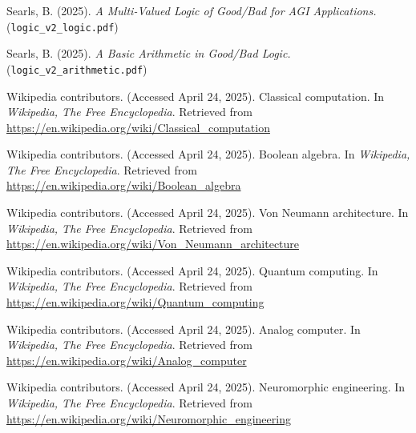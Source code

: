 \documentclass{article}
\begin{document}
\begin{thebibliography}{9} %

 Searls, B. (2025). \textit{A Multi-Valued Logic of Good/Bad for AGI Applications.} (\texttt{logic\_v2\_logic.pdf})

 Searls, B. (2025). \textit{A Basic Arithmetic in Good/Bad Logic.} (\texttt{logic\_v2\_arithmetic.pdf})

 Wikipedia contributors. (Accessed April 24, 2025). Classical computation. In \textit{Wikipedia, The Free Encyclopedia}. Retrieved from \url{https://en.wikipedia.org/wiki/Classical_computation}

 Wikipedia contributors. (Accessed April 24, 2025). Boolean algebra. In \textit{Wikipedia, The Free Encyclopedia}. Retrieved from \url{https://en.wikipedia.org/wiki/Boolean_algebra}

 Wikipedia contributors. (Accessed April 24, 2025). Von Neumann architecture. In \textit{Wikipedia, The Free Encyclopedia}. Retrieved from \url{https://en.wikipedia.org/wiki/Von_Neumann_architecture}

 Wikipedia contributors. (Accessed April 24, 2025). Quantum computing. In \textit{Wikipedia, The Free Encyclopedia}. Retrieved from \url{https://en.wikipedia.org/wiki/Quantum_computing}

 Wikipedia contributors. (Accessed April 24, 2025). Analog computer. In \textit{Wikipedia, The Free Encyclopedia}. Retrieved from \url{https://en.wikipedia.org/wiki/Analog_computer}

 Wikipedia contributors. (Accessed April 24, 2025). Neuromorphic engineering. In \textit{Wikipedia, The Free Encyclopedia}. Retrieved from \url{https://en.wikipedia.org/wiki/Neuromorphic_engineering}


\end{thebibliography}
\end{document}
